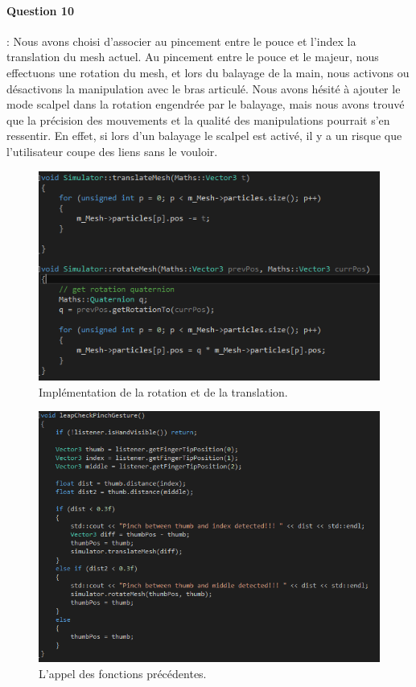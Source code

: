 \documentclass[a4paper,12pt]{article}
\begin{document}
\paragraph{Question 10} : Nous avons choisi d'associer au pincement entre le pouce et l'index la translation du mesh actuel. Au pincement entre le pouce et le majeur, nous effectuons une rotation du mesh, et lors du balayage de la main, nous activons ou désactivons la manipulation avec le bras articulé. Nous avons hésité à ajouter le mode \og{}scalpel\fg{} dans la rotation engendrée par le balayage, mais nous avons trouvé que la précision des mouvements et la qualité des manipulations pourrait s'en ressentir. En effet, si lors d'un balayage le scalpel est activé, il y a un risque que l'utilisateur coupe des liens sans le vouloir.
\begin{figure}
  \centering
  \includegraphics{images/swipe_pinch_code.png}
  \caption{Implémentation de la rotation et de la translation.}
  \label{fig:pinchSwipe}
\end{figure}
\begin{figure}
  \centering
  \includegraphics{images/swipe_pinch_appel.png}
  \caption{L'appel des fonctions précédentes.}
  \label{fig:pinchC all}
\end{figure}
\end{document}
